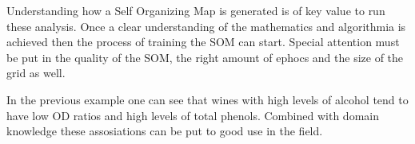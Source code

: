 \documentclass[]{book}
\begin{document}
Understanding how a Self Organizing Map is generated is of key value to
run these analysis. Once a clear understanding of the mathematics and
algorithmia is achieved then the process of training the SOM can start.
Special attention must be put in the quality of the SOM, the right
amount of ephocs and the size of the grid as well.

In the previous example one can see that wines with high levels of
alcohol tend to have low OD ratios and high levels of total phenols.
Combined with domain knowledge these assosiations can be put to good use
in the field.


\end{document}
